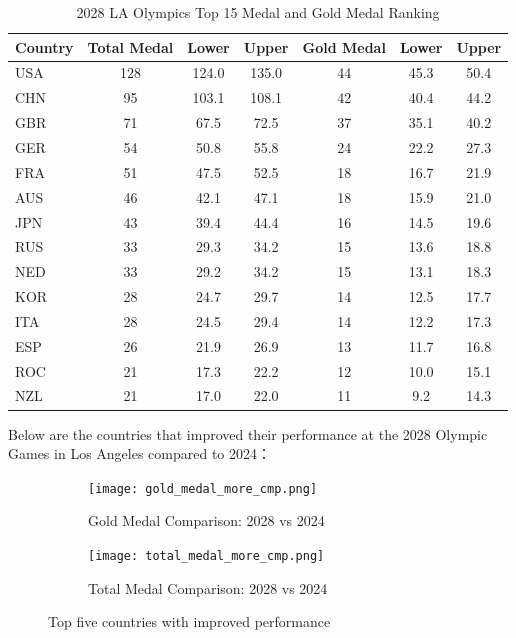 \documentclass{mcmthesis}
\renewcommand{\arraystretch}{1.2}
\begin{document}
\begin{table}[H]
	\centering
	\caption{2028 LA Olympics Top 15 Medal and Gold Medal Ranking}
	\label{tab:combined_medals}
	\renewcommand{\arraystretch}{1.2}
	\begin{tabularx}{\textwidth}{l|ccc|ccc}
		\toprule
		\rowcolor{red!10}
		\textbf{Country} & \textbf{Total Medal} & \textbf{Lower} & \textbf{Upper} & \textbf{Gold Medal} & \textbf{Lower} & \textbf{Upper} \\
		\midrule
		\rowcolor{gray!10}
		USA & 128 & 124.0 & 135.0 & 44 & 45.3 & 50.4 \\
		CHN & 95& 103.1 & 108.1 & 42 & 40.4 & 44.2 \\
		\rowcolor{gray!10}
		GBR & 71 & 67.5 & 72.5 & 37 & 35.1 & 40.2 \\
		GER & 54 & 50.8 & 55.8 & 24 & 22.2 & 27.3 \\
		\rowcolor{gray!10}
		FRA & 51 & 47.5 & 52.5 & 18 & 16.7 & 21.9 \\
		AUS & 46 & 42.1 & 47.1 & 18 & 15.9 & 21.0 \\
		\rowcolor{gray!10}
		JPN & 43 & 39.4 & 44.4 & 16 & 14.5 & 19.6 \\
		RUS & 33 & 29.3 & 34.2 & 15 & 13.6 & 18.8 \\
		\rowcolor{gray!10}
		NED & 33 & 29.2 & 34.2 & 15 & 13.1 & 18.3 \\
		KOR & 28 & 24.7 & 29.7 & 14 & 12.5 & 17.7 \\
		\rowcolor{gray!10}
		ITA & 28 & 24.5 & 29.4 & 14 & 12.2 & 17.3 \\
		ESP & 26 & 21.9 & 26.9 & 13 & 11.7 & 16.8 \\
		\rowcolor{gray!10}
		ROC & 21 & 17.3 & 22.2 & 12 & 10.0 & 15.1 \\
		NZL & 21 & 17.0 & 22.0 & 11 & 9.2 & 14.3 \\
		\bottomrule
	\end{tabularx}
\end{table}

Below are the countries that improved their performance at the 2028 Olympic Games in Los Angeles compared to 2024：
\begin{figure}[h!]
	\centering
	\begin{subfigure}[b]{0.45\textwidth}
		\texttt{[image: gold\_medal\_more\_cmp.png]}
		\caption{Gold Medal Comparison: 2028 vs 2024}
		\label{fig:gold_medal}
	\end{subfigure}
	\hfill
	\begin{subfigure}[b]{0.45\textwidth}
		\texttt{[image: total\_medal\_more\_cmp.png]}
		\caption{Total Medal Comparison: 2028 vs 2024}
		\label{fig:total_medal}
	\end{subfigure}
	\caption{Top five countries with improved performance}
	\label{fig:medal_comparison}
\end{figure}
\end{document}
